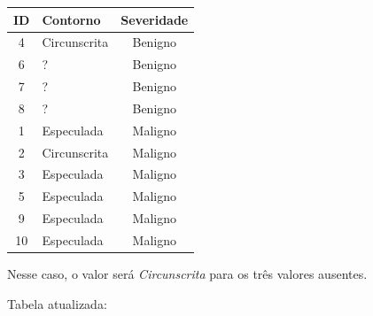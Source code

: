 \documentclass{article}
\begin{document}
\begin{enumerate}[label=\alph*]
  \begin{table}[]
    \centering
    \begin{tabular}{|c|l|c|}
    \hline
    \rowcolor[HTML]{C0C0C0} 
    ID & Contorno     & Severidade                     \\ \hline
    \rowcolor[HTML]{FFCCC9} 
    4  & Circunscrita & Benigno                        \\ \hline
    \rowcolor[HTML]{FFCE93} 
    6  & ?            & Benigno                        \\ \hline
    \rowcolor[HTML]{FFCE93} 
    7  & ?            & Benigno                        \\ \hline
    \rowcolor[HTML]{FFCE93} 
    8  & ?            & Benigno                        \\ \hline
    1  & Especulada   & {\color[HTML]{333333} Maligno} \\ \hline
    2  & Circunscrita & Maligno                        \\ \hline
    3  & Especulada   & Maligno                        \\ \hline
    5  & Especulada   & Maligno                        \\ \hline
    9  & Especulada   & Maligno                        \\ \hline
    10 & Especulada   & Maligno                        \\ \hline
    \end{tabular}
    \end{table}

Nesse caso, o valor será \textit{Circunscrita} para os três valores ausentes.

Tabela atualizada:


\end{enumerate}
\end{document}
